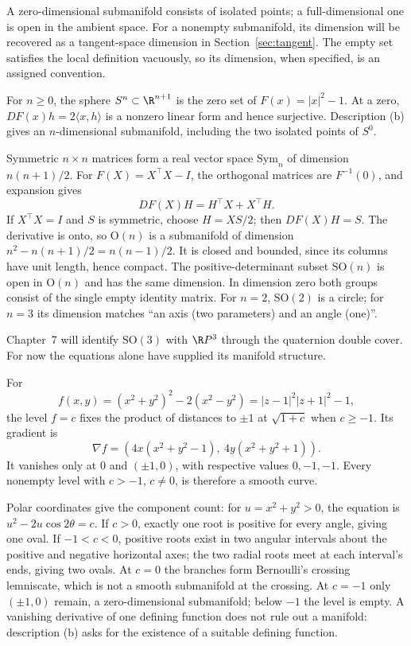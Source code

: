 A zero-dimensional submanifold consists of isolated points; a full-dimensional one is open in the ambient space. For a nonempty submanifold, its dimension will be recovered as a tangent-space dimension in Section~\ref{sec:tangent}. The empty set satisfies the local definition vacuously, so its dimension, when specified, is an assigned convention.

\begin{example}[spheres]\label{ex:spheres}
For $n\ge0$, the sphere $S^n\subset\R^{n+1}$ is the zero set of $F(x)=|x|^2-1$. At a zero,
$DF(x)h=2\langle x,h\rangle$ is a nonzero linear form and hence surjective. Description (b) gives an $n$-dimensional submanifold, including the two isolated points of $S^0$.
\end{example}

\begin{example}\label{ex:on}
Symmetric $n\times n$ matrices form a real vector space $\mathrm{Sym}_n$ of dimension $n(n+1)/2$. For $F(X)=X^\top X-I$, the orthogonal matrices are $F^{-1}(0)$, and expansion gives
\[
DF(X)H=H^\top X+X^\top H.
\]
If $X^\top X=I$ and $S$ is symmetric, choose $H=XS/2$; then $DF(X)H=S$. The derivative is onto, so $\mathrm O(n)$ is a submanifold of dimension
$n^2-n(n+1)/2=n(n-1)/2$. It is closed and bounded, since its columns have unit length, hence compact. The positive-determinant subset $\mathrm{SO}(n)$ is open in $\mathrm O(n)$ and has the same dimension. In dimension zero both groups consist of the single empty identity matrix. For $n=2$, $\mathrm{SO}(2)$ is a circle; for $n=3$ its dimension matches ``an axis (two parameters) and an angle (one)''.
\end{example}

Chapter~7 will identify $\mathrm{SO}(3)$ with $\R P^3$ through the quaternion double cover. For now the equations alone have supplied its manifold structure.

\begin{example}\label{ex:cassini}
For
\[
f(x,y)=(x^2+y^2)^2-2(x^2-y^2)=|z-1|^2|z+1|^2-1,
\]
the level $f=c$ fixes the product of distances to $\pm1$ at $\sqrt{1+c}$ when $c\ge-1$. Its gradient is
\[
\nabla f=(4x(x^2+y^2-1),\ 4y(x^2+y^2+1)).
\]
It vanishes only at $0$ and $(\pm1,0)$, with respective values $0,-1,-1$. Every nonempty level with $c>-1$, $c\ne0$, is therefore a smooth curve.

Polar coordinates give the component count: for $u=x^2+y^2>0$, the equation is $u^2-2u\cos2\theta=c$. If $c>0$, exactly one root is positive for every angle, giving one oval. If $-1<c<0$, positive roots exist in two angular intervals about the positive and negative horizontal axes; the two radial roots meet at each interval's ends, giving two ovals. At $c=0$ the branches form Bernoulli's crossing lemniscate, which is not a smooth submanifold at the crossing. At $c=-1$ only $(\pm1,0)$ remain, a zero-dimensional submanifold; below $-1$ the level is empty. A vanishing derivative of one defining function does not rule out a manifold: description (b) asks for the existence of a suitable defining function.
\end{example}

